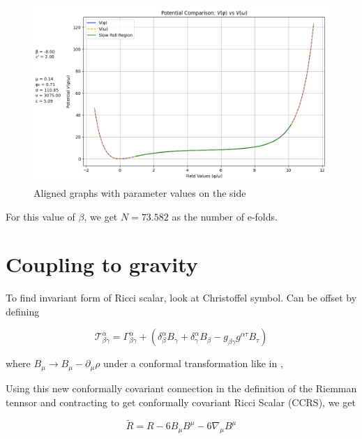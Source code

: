 \documentclass{article}
\begin{document}
\begin{figure}[h!]
    \centering
    \includegraphics[width=1\textwidth]{Python/Figures/Comparing Silvio - Barker.png}
    \caption{Aligned graphs with parameter values on the side}
    \label{Aligned Potential}
\end{figure}



For this value of $\beta$, we get $N = 73.582$ as the number of e-folds.

\newpage

\newpage
\section{Coupling to gravity}


To find invariant form of Ricci scalar, look at Christoffel symbol. Can be offset by defining


\begin{equation}
    \mathcal{T}^{\alpha}_{\beta \gamma} = \Gamma^{\alpha}_{\beta \gamma} + (\delta^{\alpha}_{\beta} B_{\gamma} + \delta^{\alpha}_{\gamma} B_{\beta} - g_{\beta \gamma}g^{\alpha \tau}B_{\tau})
\end{equation}

where $B_{\mu} \rightarrow B_{\mu} - \partial_{\mu} \rho$ under a conformal transformation like in \cite{barker2024poincaregaugetheoryconformal}, 

Using this new conformally covariant connection in the definition of the Riemman tennsor and contracting to get conformally covariant Ricci Scalar (CCRS), we get 


\begin{equation}
    \tilde{R} = R - 6 B_{\mu} B^{\mu} - 6 \nabla_\mu B^\mu
\end{equation}
\end{document}
